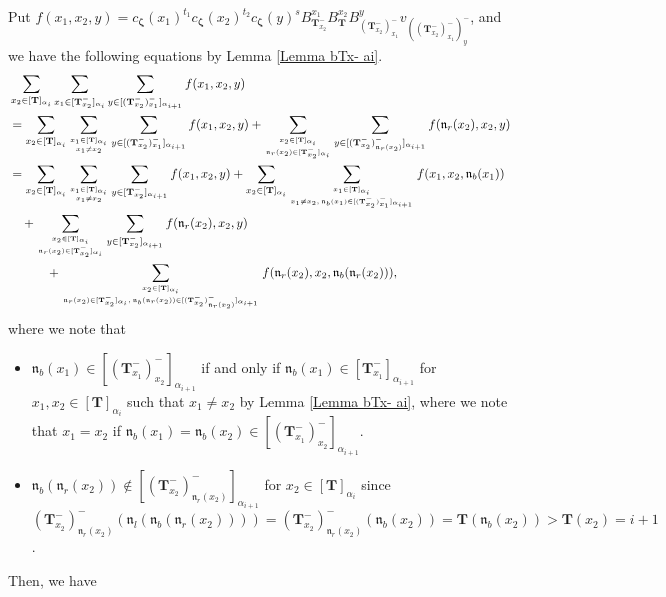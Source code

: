 \documentclass[12pt]{amsart}
\numberwithin{equation}{thm}
\newcommand\bT{\mathbf T}
\newcommand\fn{\mathfrak n}
\renewcommand\a{\alpha}  %
\newcommand\Bz{\boldsymbol\zeta}
\begin{document}
Put $f(x_1,x_2,y)= c_{\Bz} (x_1)^{t_1}   c_{\Bz}(x_2)^{t_2}  c_{\Bz} (y)^s 
	B_{\bT_{x_2}^-}^{x_1} B_{\bT}^{x_2}  B_{(\bT_{x_2}^-)_{x_1}^-}^y v_{((\bT_{x_2}^-)_{x_1}^-)_y^-} $, 
and we have the following equations by  Lemma \ref{Lemma bTx- ai}. 
\begin{align*}
&\sum_{x_2 \in [\bT]_{\a_i}} \sum_{x_1 \in [\bT_{x_2}^-]_{\a_i}} \sum_{y \in [(\bT_{x_2}^-)_{x_1}^-]_{\a_{i+1}}} 
	f(x_1,x_2,y) 
\\
&= \sum_{x_2 \in [\bT]_{\a_i}} \sum_{x_1 \in [\bT]_{\a_i} \atop x_1 \not=x_2} \sum_{y \in [(\bT_{x_2}^-)_{x_1}^-]_{\a_{i+1}}} 
		f(x_1,x_2,y)
	+ \sum_{x_2 \in [\bT]_{\a_i} \atop \fn_r(x_2) \in [\bT_{x_2}^-]_{\a_i}}  \sum_{y \in [(\bT_{x_2}^-)_{\fn_r(x_2)}^-]_{\a_{i+1}}}
		f(\fn_r(x_2),x_2,y)
\\
&= \sum_{x_2 \in [\bT]_{\a_i}} \sum_{x_1 \in [\bT]_{\a_i} \atop x_1 \not=x_2} \sum_{y \in [\bT_{x_2}^-]_{\a_{i+1}}}
		f(x_1,x_2,y)
	+ \sum_{x_2 \in [\bT]_{\a_i}} \sum_{x_1 \in [\bT]_{\a_i} \atop x_1 \not=x_2, \, \fn_b(x_1) \in [(\bT_{x_2}^-)_{x_1}^-]_{\a_{i+1}}} 
		f(x_1,x_2, \fn_b(x_1))
	\\ & \quad 
	+ \sum_{x_2 \in [\bT]_{\a_i} \atop \fn_r(x_2) \in [\bT_{x_2}^-]_{\a_i}}  \sum_{y \in [\bT_{x_2}^-]_{\a_{i+1}}}
		f(\fn_r(x_2),x_2,y) 
	\\ & \hspace{3em} 
	+ \sum_{x_2 \in [\bT]_{\a_i} 
			\atop \fn_r(x_2) \in [\bT_{x_2}^-]_{\a_i}, \, \fn_b (\fn_r(x_2)) \in [(\bT_{x_2}^-)_{\fn_r(x_2)}^-]_{\a_{i+1}}}  
		f(\fn_r(x_2),x_2,\fn_b (\fn_r(x_2))), 
\end{align*}
where we note that 
\begin{itemize}
\item 
$\fn_b(x_1) \in [(\bT_{x_1}^-)_{x_2}^-]_{\a_{i+1}} $ if and only if $\fn_b(x_1) \in [\bT_{x_1}^-]_{\a_{i+1}}$ 
for $x_1,x_2 \in [\bT]_{\a_i}$ such that $x_1 \not= x_2$ by Lemma \ref{Lemma bTx- ai},  
where we note that $x_1=x_2$ if $\fn_b(x_1) = \fn_b(x_2) \in [(\bT_{x_1}^-)_{x_2}^-]_{\a_{i+1}}$. 

\item 
$\fn_b (\fn_r(x_2)) \not\in [(\bT_{x_2}^-)_{\fn_r(x_2)}^-]_{\a_{i+1}}$ for $x_2 \in [\bT]_{\a_i}$ 
since $(\bT_{x_2}^-)_{\fn_r(x_2)}^- (\fn_l( \fn_b(\fn_r(x_2)))) = (\bT_{x_2}^-)_{\fn_r(x_2)}^- ( \fn_b(x_2)) =\bT (\fn_b(x_2)) > \bT(x_2) =i+1$.
\end{itemize}
Then, we have 
\end{document}

